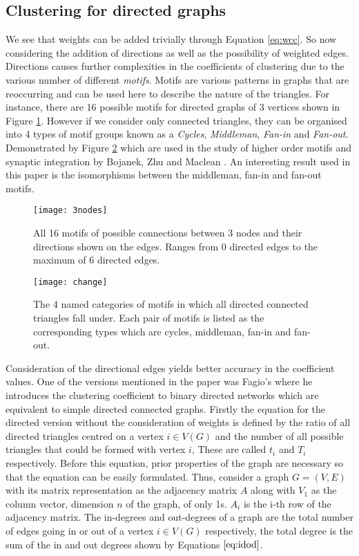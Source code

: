 \subsection{Clustering for directed graphs}

We see that weights can be added trivially through Equation \ref{eq:wcc}. So now considering the addition of directions as well as the possibility of weighted edges. Directions causes further complexities in the coefficients of clustering due to the various number of different \emph{motifs}. Motifs are various patterns in graphs that are reoccurring and can be used here to describe the nature of the triangles. For instance, there are 16 possible motifs for directed graphs of 3 vertices shown in Figure \ref{fig:3nodes}. However if we consider only connected triangles, they can be organised into 4 types of motif groups known as a \emph{Cycles}, \emph{Middleman}, \emph{Fan-in} and \emph{Fan-out}. Demonstrated by Figure \ref{fig:change} which are used in the study of higher order motifs and synaptic integration by Bojanek, Zhu and Maclean \cite{synaptic}. An interesting result used in this paper is the isomorphisms between the middleman, fan-in and fan-out motifs.

\begin{figure}[!htb]
	\centering
	\texttt{[image: 3nodes]}
	\caption{All 16 motifs of possible connections between 3 nodes and their directions shown on the edges. Ranges from 0 directed edges to the maximum of 6 directed edges.}
	\label{fig:3nodes}
\end{figure}

\begin{figure}[!htb]
	\centering
	\texttt{[image: change]}
	\caption{The 4 named categories of motifs in which all directed connected triangles fall under. Each pair of motifs is listed as the corresponding types which are cycles, middleman, fan-in and fan-out.}
	\label{fig:change}
\end{figure}

Consideration of the directional edges yields better accuracy in the coefficient values. One of the versions mentioned in the paper \cite{PhysRevResearch.3.043124} was Fagio's where he introduces the clustering coefficient to binary directed networks which are equivalent to simple directed connected graphs. Firstly the equation for the directed version without the consideration of weights is defined by the ratio of all directed triangles centred on a vertex $i \in V(G)$ and the number of all possible triangles that could be formed with vertex $i$, These are called $t_{i}$ and $T_{i}$ respectively. Before this equation, prior properties of the graph are necessary so that the equation can be easily formulated. Thus, consider a graph $G = (V, E)$ with its matrix representation as the adjacency matrix $A$ along with $V_1$ as the column vector, dimension $n$ of the graph, of only 1s. $A_i$ is the i-th row of the adjacency matrix. The in-degrees and out-degrees of a graph are the total number of edges going in or out of a vertex $i\in V(G)$ respectively, the total degree is the sum of the in and out degrees shown by Equations $\ref{eq:idod}$.

